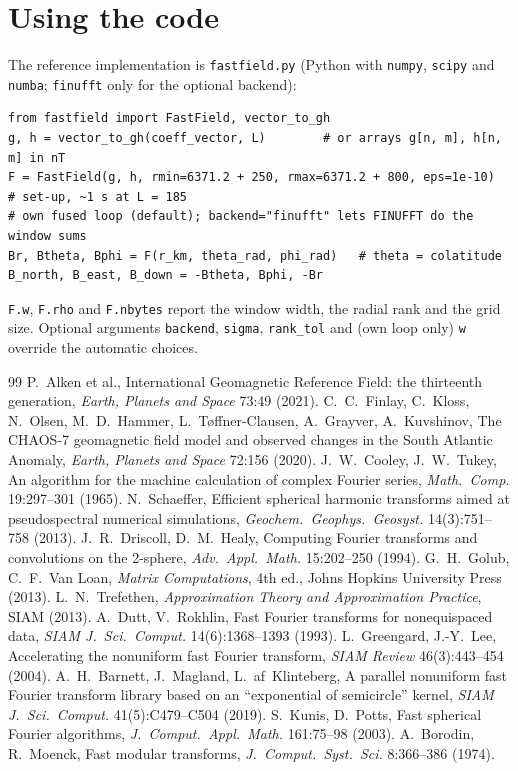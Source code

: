 \documentclass[11pt,a4paper]{article}
\theoremstyle{definition}
\begin{document}
\section{Using the code}\label{app:code}
The reference implementation is \texttt{fastfield.py} (Python with \texttt{numpy}, \texttt{scipy} and \texttt{numba}; \texttt{finufft} only for the optional backend):
\begin{lstlisting}
from fastfield import FastField, vector_to_gh
g, h = vector_to_gh(coeff_vector, L)        # or arrays g[n, m], h[n, m] in nT
F = FastField(g, h, rmin=6371.2 + 250, rmax=6371.2 + 800, eps=1e-10)   # set-up, ~1 s at L = 185
# own fused loop (default); backend="finufft" lets FINUFFT do the window sums
Br, Btheta, Bphi = F(r_km, theta_rad, phi_rad)   # theta = colatitude
B_north, B_east, B_down = -Btheta, Bphi, -Br
\end{lstlisting}
\texttt{F.w}, \texttt{F.rho} and \texttt{F.nbytes} report the window width, the radial rank and the grid size. Optional arguments
\texttt{backend}, \texttt{sigma}, \texttt{rank\_tol} and (own loop only) \texttt{w} override the automatic choices.

\begin{thebibliography}{99}\small
{} P.~Alken et al., International Geomagnetic Reference Field: the thirteenth generation, \emph{Earth, Planets and Space} 73:49 (2021).
 C.~C.~Finlay, C.~Kloss, N.~Olsen, M.~D.~Hammer, L.~T\o ffner-Clausen, A.~Grayver, A.~Kuvshinov, The CHAOS-7 geomagnetic field model and observed changes in the South Atlantic Anomaly, \emph{Earth, Planets and Space} 72:156 (2020).
 J.~W.~Cooley, J.~W.~Tukey, An algorithm for the machine calculation of complex Fourier series, \emph{Math.\ Comp.} 19:297--301 (1965).
 N.~Schaeffer, Efficient spherical harmonic transforms aimed at pseudospectral numerical simulations, \emph{Geochem.\ Geophys.\ Geosyst.} 14(3):751--758 (2013).
 J.~R.~Driscoll, D.~M.~Healy, Computing Fourier transforms and convolutions on the 2-sphere, \emph{Adv.\ Appl.\ Math.} 15:202--250 (1994).
 G.~H.~Golub, C.~F.~Van Loan, \emph{Matrix Computations}, 4th ed., Johns Hopkins University Press (2013).
 L.~N.~Trefethen, \emph{Approximation Theory and Approximation Practice}, SIAM (2013).
 A.~Dutt, V.~Rokhlin, Fast Fourier transforms for nonequispaced data, \emph{SIAM J.\ Sci.\ Comput.} 14(6):1368--1393 (1993).
 L.~Greengard, J.-Y.~Lee, Accelerating the nonuniform fast Fourier transform, \emph{SIAM Review} 46(3):443--454 (2004).
 A.~H.~Barnett, J.~Magland, L.~af~Klinteberg, A parallel nonuniform fast Fourier transform library based on an ``exponential of semicircle'' kernel, \emph{SIAM J.\ Sci.\ Comput.} 41(5):C479--C504 (2019).
 S.~Kunis, D.~Potts, Fast spherical Fourier algorithms, \emph{J.\ Comput.\ Appl.\ Math.} 161:75--98 (2003).
 A.~Borodin, R.~Moenck, Fast modular transforms, \emph{J.\ Comput.\ Syst.\ Sci.} 8:366--386 (1974).
\end{thebibliography}
\end{document}
